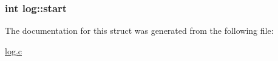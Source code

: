 \subsubsection[{\texorpdfstring{start}{start}}]{\setlength{\rightskip}{0pt plus 5cm}int log\+::start}\hypertarget{structlog_a28d847dd722497fa3497b14f68267618}{}\label{structlog_a28d847dd722497fa3497b14f68267618}


The documentation for this struct was generated from the following file\+:\begin{DoxyCompactItemize}
\item 
\hyperlink{log_8c}{log.\+c}\end{DoxyCompactItemize}
